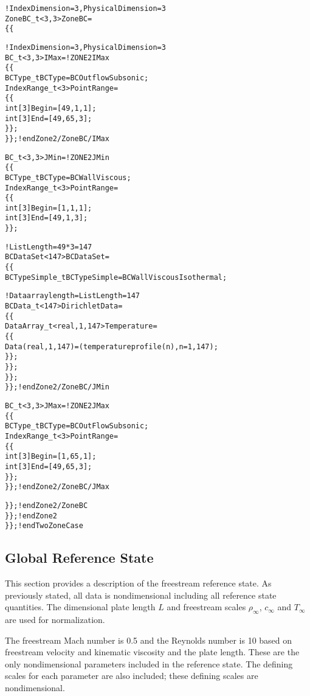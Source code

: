 \begin{alltt}
    !  IndexDimension = 3, PhysicalDimension = 3
    ZoneBC\_t<3,3> ZoneBC =
      \{\{
 
      !  IndexDimension = 3, PhysicalDimension = 3
      BC\_t<3,3> IMax =                                  !  ZONE 2 IMax
        \{\{
        BCType\_t BCType = BCOutflowSubsonic ;
        IndexRange\_t<3> PointRange = 
          \{\{
          int[3] Begin = [49,1 ,1] ;
          int[3] End   = [49,65,3] ;
          \}\} ;
        \}\} ;    ! end Zone2/ZoneBC/IMax

      BC\_t<3,3> JMin =                                  !  ZONE 2 JMin
        \{\{
        BCType\_t BCType = BCWallViscous ;
        IndexRange\_t<3> PointRange = 
          \{\{
          int[3] Begin = [1 ,1,1] ;
          int[3] End   = [49,1,3] ;
          \}\} ;
        
        !  ListLength = 49*3 = 147
        BCDataSet<147> BCDataSet =
          \{\{
          BCTypeSimple\_t BCTypeSimple = BCWallViscousIsothermal ;

          !  Data array length = ListLength = 147
          BCData\_t<147> DirichletData = 
            \{\{
            DataArray\_t<real, 1, 147> Temperature =
              \{\{
              Data(real, 1, 147) = (temperatureprofile(n), n=1,147) ;
              \}\} ;
            \}\} ;
          \}\} ;
        \}\} ;    ! end Zone2/ZoneBC/JMin

      BC\_t<3,3> JMax =                                  !  ZONE 2 JMax
        \{\{
        BCType\_t BCType = BCOutFlowSubsonic ;
        IndexRange\_t<3> PointRange = 
          \{\{
          int[3] Begin = [1 ,65,1] ;
          int[3] End   = [49,65,3] ;
          \}\} ;
        \}\} ;    ! end Zone2/ZoneBC/JMax

      \}\} ;      ! end Zone2/ZoneBC
    \}\} ;        ! end Zone2
  \}\} ;          ! end TwoZoneCase
\end{alltt}

\subsection{Global Reference State}

This section provides a description of the freestream reference
state.  As previously stated, all data is nondimensional including
all reference state quantities.  The dimensional plate length $L$ and
freestream scales $\rho_\infty$, $c_\infty$ and $T_\infty$ are used for
normalization.

The freestream Mach number is 0.5 and the Reynolds number is 10
based on freestream velocity and kinematic viscosity and the plate
length.
These are the only nondimensional parameters included in the reference
state.
The defining scales for each parameter are also included; these defining
scales are nondimensional.

